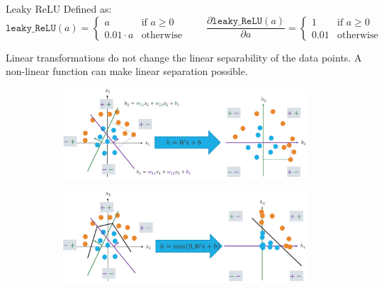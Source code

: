 \begin{description}
\begin{descriptionlist}
            \item[Leaky ReLU] 
                Defined as:
                \[ 
                    \texttt{leaky\_ReLU}(a) = \begin{cases}
                        a & \text{if $a \geq 0$} \\
                        0.01 \cdot a & \text{otherwise}
                    \end{cases} \hspace{2em}
                    \frac{\partial \texttt{leaky\_ReLU}(a)}{\partial a} = \begin{cases}
                        1 & \text{if } a \geq 0 \\
                        0.01 & \text{otherwise}
                    \end{cases}
                \]
        \end{descriptionlist}

        \begin{example}
            Linear transformations do not change the linear separability of the data points.
            A non-linear function can make linear separation possible.

            \begin{figure}[H]
                \centering
                \begin{subfigure}{0.6\linewidth}
                    \centering
                    \includegraphics[width=\linewidth]{./img/relu_separability_1.png}
                \end{subfigure}

                \begin{subfigure}{0.6\linewidth}
                    \centering
                    \includegraphics[width=\linewidth]{./img/relu_separability_2.png}
                \end{subfigure}
            \end{figure}
        \end{example}
    

\end{description}
